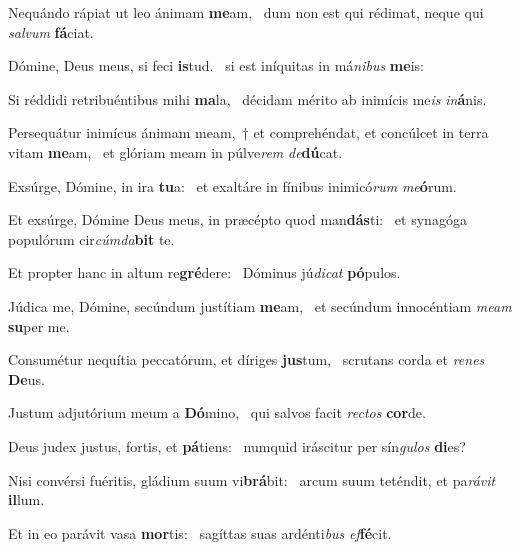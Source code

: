 \item Nequándo rápiat ut leo ánimam \textbf{me}am,~\psstar{} dum non est qui rédimat, neque qui \textit{sal}\textit{vum} \textbf{fá}ciat.

\item Dómine, Deus meus, si feci \textbf{is}tud.~\psstar{} si est iníquitas in má\textit{ni}\textit{bus} \textbf{me}is:

\item Si réddidi retribuéntibus mihi \textbf{ma}la,~\psstar{} décidam mérito ab inimícis me\textit{is} \textit{in}\textbf{á}nis.

\item Persequátur inimícus ánimam meam,~† et comprehéndat, et concúlcet in terra vitam \textbf{me}am,~\psstar{} et glóriam meam in púlve\textit{rem} \textit{de}\textbf{dú}cat.

\item Exsúrge, Dómine, in ira \textbf{tu}a:~\psstar{} et exaltáre in fínibus inimicó\textit{rum} \textit{me}\textbf{ó}rum.

\item Et exsúrge, Dómine Deus meus, in præcépto quod man\textbf{dás}ti:~\psstar{} et synagóga populórum cir\textit{cúm}\textit{da}\textbf{bit} te.

\item Et propter hanc in altum re\textbf{gré}dere:~\psstar{} Dóminus jú\textit{di}\textit{cat} \textbf{pó}pulos.

\item Júdica me, Dómine, secúndum justítiam \textbf{me}am,~\psstar{} et secúndum innocéntiam \textit{me}\textit{am} \textbf{su}per me.

\item Consumétur nequítia peccatórum, et díriges \textbf{jus}tum,~\psstar{} scrutans corda et \textit{re}\textit{nes} \textbf{De}us.

\item Justum adjutórium meum a \textbf{Dó}mino,~\psstar{} qui salvos facit \textit{rec}\textit{tos} \textbf{cor}de.

\item Deus judex justus, fortis, et \textbf{pá}tiens:~\psstar{} numquid iráscitur per sín\textit{gu}\textit{los} \textbf{di}es?

\item Nisi convérsi fuéritis, gládium suum vi\textbf{brá}bit:~\psstar{} arcum suum teténdit, et pa\textit{rá}\textit{vit} \textbf{il}lum.

\item Et in eo parávit vasa \textbf{mor}tis:~\psstar{} sagíttas suas ardénti\textit{bus} \textit{ef}\hspace{-0.5mm}\textbf{fé}cit.

